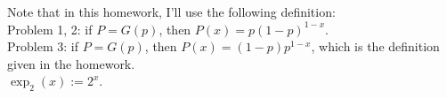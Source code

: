 Note that in this homework, I'll use the following definition:\\
Problem 1, 2: if $P=G(p)$, then $P(x)=p(1-p)^{1-x}$.\\
Problem 3: if $P=G(p)$, then $P(x)=(1-p)p^{1-x}$, which is the definition given in the homework.\\
$\exp_2(x):=2^x$.
